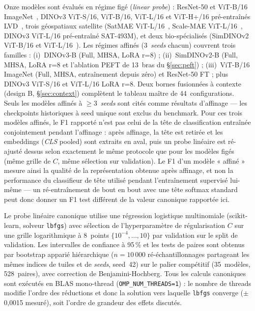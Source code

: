 \documentclass[11pt,a4paper]{article}
\newcommand{\lp}{\emph{linear probe}}
\begin{document}
Onze modèles sont évalués en régime figé (\lp{}) : ResNet-50 et ViT-B/16 ImageNet~\autocite{he2016resnet,dosovitskiy2021vit}, DINOv3 ViT-S/16, ViT-B/16, ViT-L/16 et ViT-H+/16 pré-entraînés LVD~\autocite{darcet2024dinov3}, trois géospatiaux satellite (SatMAE ViT-L/16~\autocite{cong2022satmae}, Scale-MAE ViT-L/16~\autocite{reed2023scalemae}, DINOv3 ViT-L/16 pré-entraîné SAT-493M), et deux bio-spécialisés (SimDINOv2 ViT-B/16 et ViT-L/16~\autocite{moummad2026selfsupervised}). Les régimes affinés (3~\emph{seeds} chacun) couvrent trois familles : (i)~DINOv3-B (Full, MHSA, LoRA r=8) ; (ii)~SimDINOv2-B (Full, MHSA, LoRA r=8 et l'ablation PEFT de 13~bras du \S\ref{sec:peft}) ; (iii)~ViT-B/16 ImageNet (Full, MHSA, entraînement depuis zéro) et ResNet-50 FT ; plus DINOv3 ViT-S/16 et ViT-L/16 LoRA r=8. Deux bornes fusionnées à contexte (design B, \S\ref{sec:context}) complètent le tableau maître de 44~configurations. Seuls les modèles affinés à $\geq$3~\emph{seeds} sont cités comme résultats d'affinage — les checkpoints historiques à seed unique sont exclus du benchmark. Pour ces trois modèles affinés, le F1 rapporté n'est pas celui de la tête de classification entraînée conjointement pendant l'affinage : après affinage, la tête est retirée et les embeddings (\emph{CLS} pooled) sont extraits en aval, puis un probe linéaire est ré-ajusté dessus selon exactement le même protocole que pour les modèles figés (même grille de $C$, même sélection sur validation). Le F1 d'un modèle « affiné » mesure ainsi la qualité de la représentation obtenue après affinage, et non la performance du classifieur de tête utilisé pendant l'entraînement supervisé lui-même — un ré-entraînement de bout en bout avec une tête softmax standard peut donc donner un F1 test différent de la valeur canonique rapportée ici.

Le probe linéaire canonique utilise une régression logistique multinomiale (scikit-learn, solveur \texttt{lbfgs}) avec sélection de l'hyperparamètre de régularisation $C$ sur une grille logarithmique à 8~points $\{10^{-4},\dots,10\}$ par validation sur le split de validation. Les intervalles de confiance à 95\,\% et les tests de paires sont obtenus par bootstrap apparié hiérarchique ($n=10\,000$ ré-échantillonnages partageant les mêmes indices de tuiles et de \emph{seeds}, seed~42) sur le palier compétitif (35~modèles, 528~paires), avec correction de Benjamini-Hochberg. Tous les calculs canoniques sont exécutés en BLAS mono-thread (\texttt{OMP\_NUM\_THREADS=1}) : le nombre de threads modifie l'ordre des réductions et donc la solution vers laquelle \texttt{lbfgs} converge ($\pm$0,0015 mesuré), soit l'ordre de grandeur des effets discutés.
\end{document}

